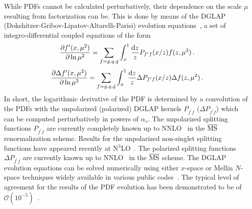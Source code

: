 While PDFs cannot be calculated perturbatively, their dependence on the scale 
$\mu$ resulting from factorization can be.
%
This is done by means of the
DGLAP (Dokshitzer-Gribov-Lipatov-Altarelli-Parisi) 
evolution equations~\cite{Dokshitzer:1977sg,Gribov:1972ri,Altarelli:1977zs},
a set of integro-differential coupled equations of the form
\begin{equation}
  \label{eq:dglapunp}
\frac{\partial f^\prime(x,\mu^2)}{\partial \ln \mu^2}
=
\sum_{f=g,q,\bar{q}}\int_x^1 
\frac{{\rm d}z}{z}P_{f^\prime f}(x/z)f(z,\mu^2)\, .
\end{equation}
%
\begin{equation}
  \label{eq:dglappol}
\frac{\partial \Delta f^\prime(x,\mu^2)}{\partial \ln \mu^2}
=
\sum_{f=g,q,\bar{q}}\int_x^1 
\frac{{\rm d}z}{z}\Delta P_{f^\prime f}(x/z)\Delta f(z,\mu^2)\, .
\end{equation}
%
In short, the logarithmic derivative of the PDF is determined by a convolution
of the PDFs with the unpolarized (polarized) DGLAP kernels $P_{f^\prime f}$
($\Delta P_{f^\prime f}$) which can be 
computed perturbatively in powers of $\alpha_{s}$.
%
The unpolarized splitting functions $P_{f^\prime f}$ are currently completely 
known up to NNLO~\cite{mvvns,Vogt:2004mw} in the $\overline{\rm MS}$ 
renormalization scheme.
%
Results for the unpolarized non-singlet splitting functions have appeared 
recently at N$^3$LO~\cite{Davies:2016jie,Moch:2017uml}.
%
The polarized splitting functions $\Delta P_{f^\prime f}$ are currently known 
up to  NNLO~\cite{Moch:2014sna} in the $\overline{\rm MS}$ scheme.
%
The DGLAP evolution equations can be solved numerically using
either $x$-space or Mellin $N$-space techniques widely available in various
public codes~\cite{Vogt:2004ns,Salam:2008qg,Botje:2010ay,
Bertone:2013vaa,Bertone:2015cwa}.
%
The typical level of agreement for the results of the PDF evolution 
has been demonstrated to be of 
$\mathcal{O}(10^{-5})$~\cite{Giele:2002hx,Dittmar:2005ed}.

%
%
%
%

